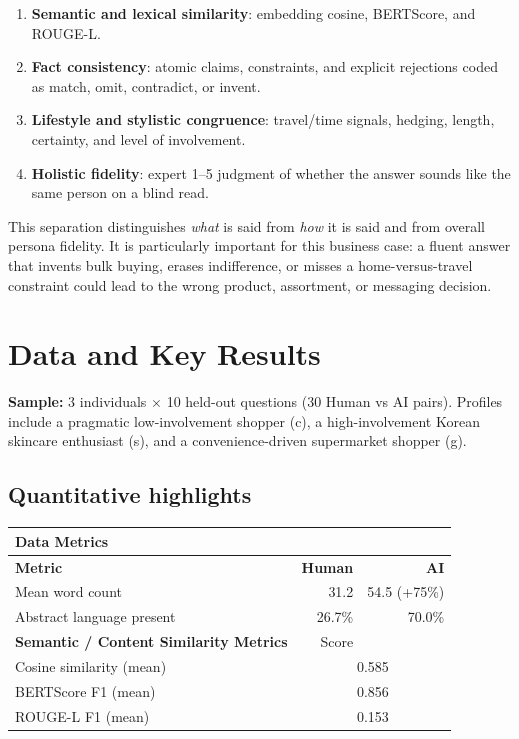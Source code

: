 \documentclass[10pt,a4paper]{article}
\begin{document}
\begin{enumerate}
    \item \textbf{Semantic and lexical similarity}: embedding cosine, BERTScore, and ROUGE-L.
    \item \textbf{Fact consistency}: atomic claims, constraints, and explicit rejections coded as match, omit, contradict, or invent.
    \item \textbf{Lifestyle and stylistic congruence}: travel/time signals, hedging, length, certainty, and level of involvement.
    \item \textbf{Holistic fidelity}: expert 1--5 judgment of whether the answer sounds like the same person on a blind read.
\end{enumerate}

This separation distinguishes \textit{what} is said from \textit{how} it is said and from overall persona fidelity. It is particularly important for this business case: a fluent answer that invents bulk buying, erases indifference, or misses a home-versus-travel constraint could lead to the wrong product, assortment, or messaging decision.

\section{Data and Key Results}

\textbf{Sample:} 3 individuals $\times$ 10 held-out questions (30 Human vs AI pairs). Profiles include a pragmatic low-involvement shopper (c), a high-involvement Korean skincare enthusiast (s), and a convenience-driven supermarket shopper (g).

\subsection{Quantitative highlights}
\begin{tabular}{@{}lrr@{}}
\toprule
\textbf{Data Metrics}\\
\midrule
\textbf{Metric} & \textbf{Human} & \textbf{AI} \\
\midrule
Mean word count & 31.2 & 54.5 (+75\%) \\
Abstract language present & 26.7\% & 70.0\% \\
\midrule
\textbf{Semantic / Content Similarity Metrics} &  Score\\
\midrule
Cosine similarity (mean) & \multicolumn{2}{c}{0.585} \\
BERTScore F1 (mean) & \multicolumn{2}{c}{0.856} \\
ROUGE-L F1 (mean) & \multicolumn{2}{c}{0.153} \\
\bottomrule
\end{tabular}
\end{document}
